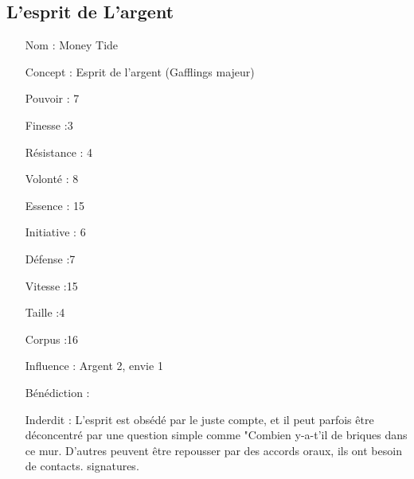 \documentclass[oneside,12pt]{book}
\begin{document}
\begin{flushleft}
\subsection{L'esprit de L'argent}
\begin{itemize}
\item[Nom]: Money Tide
\item[Concept]: Esprit de l'argent (Gafflings majeur)
\item[Pouvoir]: 7
\item[Finesse]:3
\item[Résistance]: 4
\item[Volonté]: 8
\item[Essence]: 15
\item[Initiative]: 6
\item[Défense]:7
\item[Vitesse]:15
\item[Taille]:4
\item[Corpus]:16
\item[Influence]: Argent 2, envie 1
\item[Bénédiction]: 
\item[Inderdit]: L'esprit est obsédé par le juste compte, et il peut parfois être déconcentré par une question simple comme "Combien y-a-t'il de briques dans ce mur.
D'autres peuvent être repousser par des accords oraux, ils ont besoin de contacts.
signatures.
\end{itemize}

\end{flushleft}
\end{document}
